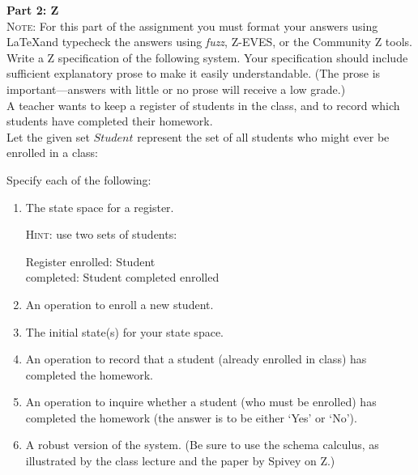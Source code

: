 \documentclass{article}
\begin{document}
\noindent \textbf{Part 2: Z} \\

\noindent \textsc{Note}: For this part of the assignment you must format your
answers using \LaTeX and typecheck the answers using {\em fuzz},  Z-EVES, or the Community Z tools.  \\

\noindent Write a Z specification of the following system. Your specification should include sufficient explanatory
prose to make it easily understandable. (The prose is important---answers with little
or no prose will receive a low grade.)\\[2ex]
A teacher wants to keep a register of students in the class, and to record which students have completed their homework. \\[2ex]
Let the given set $Student$ represent the set of all students who might ever be enrolled in a class:
\begin{zed}
[Student]
\end{zed}
Specify each of the following:
\begin{enumerate}
\item The state space for a register.

\textsc{Hint}: use two sets of students:
\begin{schema}{Register}
enrolled: \power Student\\
completed: \power Student
\where
completed \subseteq enrolled \\
\end{schema}
\item An operation to enroll a new student.
\item The initial state(s)  for your state space.
\item An operation to record that a student (already enrolled in class) has completed the homework.
\item An operation to inquire whether a student (who must be enrolled) has completed the homework (the answer is to be either `Yes' or `No').
\item A robust version of the system. (Be sure to use the schema calculus, as illustrated by the class lecture and the paper by Spivey on Z.) \\  
\end{enumerate}
\end{document}
